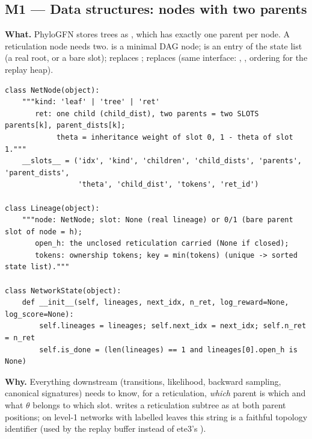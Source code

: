 \subsection{M1 --- Data structures: nodes with two parents}
\textbf{What.} PhyloGFN stores trees as , which has exactly one parent per node. A reticulation node needs two.  is a minimal DAG node;  is an entry of the state list (a real root, or a bare slot);  replaces ;  replaces  (same interface: , , ordering for the replay heap).
\begin{lstlisting}
class NetNode(object):
    """kind: 'leaf' | 'tree' | 'ret'
       ret: one child (child_dist), two parents = two SLOTS parents[k], parent_dists[k];
            theta = inheritance weight of slot 0, 1 - theta of slot 1."""
    __slots__ = ('idx', 'kind', 'children', 'child_dists', 'parents', 'parent_dists',
                 'theta', 'child_dist', 'tokens', 'ret_id')

class Lineage(object):
    """node: NetNode; slot: None (real lineage) or 0/1 (bare parent slot of node = h);
       open_h: the unclosed reticulation carried (None if closed);
       tokens: ownership tokens; key = min(tokens) (unique -> sorted state list)."""

class NetworkState(object):
    def __init__(self, lineages, next_idx, n_ret, log_reward=None, log_score=None):
        self.lineages = lineages; self.next_idx = next_idx; self.n_ret = n_ret
        self.is_done = (len(lineages) == 1 and lineages[0].open_h is None)
\end{lstlisting}
\textbf{Why.} Everything downstream (transitions, likelihood, backward sampling, canonical signatures) needs to know, for a reticulation, \emph{which} parent is which and what $\theta$ belongs to which slot.  writes a reticulation subtree as  at both parent positions; on level-1 networks with labelled leaves this string is a faithful topology identifier (used by the replay buffer instead of ete3's ).

